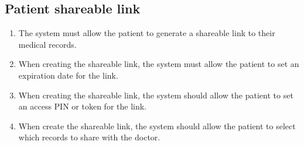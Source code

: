 \subsection{Patient shareable link}
\begin{enumerate}
    \item The system must allow the patient to generate a shareable link to their medical records.
    \item When creating the shareable link, the system must allow the patient to set an expiration date for the link.
    \item When creating the shareable link, the system should allow the patient to set an access PIN or token for the link.
    \item When create the shareable link, the system should allow the patient to select which records to share with the doctor.
\end{enumerate}